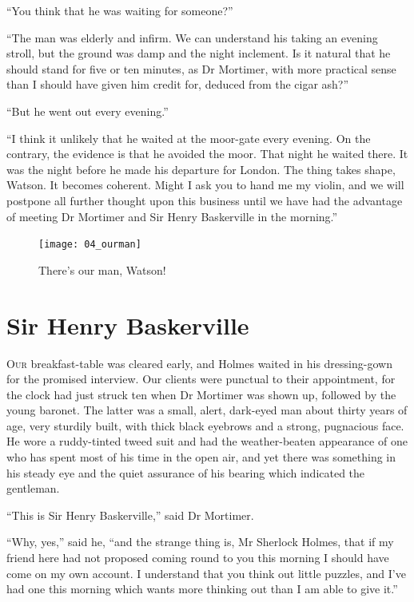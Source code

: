 \documentclass[paper=a5,BCOR=7mm,twoside,DIV=calc,12pt,usegeometry,openany,chapterprefix,endperiod,headings=big]{scrbook} %
\begin{document}
\enquote{You think that he was waiting for someone?}

\enquote{The man was elderly and infirm. We can understand his taking an evening stroll, but the ground was damp and the night inclement. Is it natural that he should stand for five or ten minutes, as Dr Mortimer, with more practical sense than I should have given him credit for, deduced from the cigar ash?}

\enquote{But he went out every evening.}

\enquote{I think it unlikely that he waited at the moor-gate every evening. On the contrary, the evidence is that he avoided the moor. That night he waited there. It was the night before he made his departure for London. The thing takes shape, Watson. It becomes coherent. Might I ask you to hand me my violin, and we will postpone all further thought upon this business until we have had the advantage of meeting Dr Mortimer and Sir Henry Baskerville in the morning.}
\clearpage
\vfill
\begin{figure}[ph!]
\centering
\texttt{[image: 04\_ourman]}
\caption{There's our man, Watson!}
\end{figure}
\vfill
\thispagestyle{empty}
\clearpage

\chapter{Sir Henry Baskerville}
\lettrine[lines=1]{O}{ur} breakfast-table was cleared early, and Holmes waited in his dressing-gown for the promised interview. Our clients were punctual to their appointment, for the clock had just struck ten when Dr Mortimer was shown up, followed by the young baronet. The latter was a small, alert, dark-eyed man about thirty years of age, very sturdily built, with thick black eyebrows and a strong, pugnacious face. He wore a ruddy-tinted tweed suit and had the weather-beaten appearance of one who has spent most of his time in the open air, and yet there was something in his steady eye and the quiet assurance of his bearing which indicated the gentleman.

\enquote{This is Sir Henry Baskerville,} said Dr Mortimer.


\enquote{Why, yes,} said he, \enquote{and the strange thing is, Mr Sherlock Holmes, that if my friend here had not proposed coming round to you this morning I should have come on my own account. I understand that you think out little puzzles, and I've had one this morning which wants more thinking out than I am able to give it.}
\end{document}
